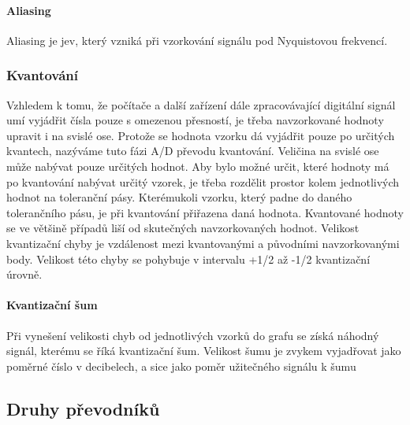 \paragraph{Aliasing}
Aliasing je jev, který vzniká při vzorkování signálu pod Nyquistovou frekvencí.

\subsubsection{Kvantování}
Vzhledem k tomu, že počítače a další zařízení dále zpracovávající digitální signál umí vyjádřit čísla pouze s omezenou přesností, je třeba navzorkované hodnoty upravit i na svislé ose. Protože se hodnota vzorku dá vyjádřit pouze po určitých kvantech, nazýváme tuto fázi A/D převodu kvantování. Veličina na svislé ose může nabývat pouze určitých hodnot. Aby bylo možné určit, které hodnoty má po kvantování nabývat určitý vzorek, je třeba rozdělit prostor kolem jednotlivých hodnot na toleranční pásy. Kterémukoli vzorku, který padne do daného tolerančního pásu, je při kvantování přiřazena daná hodnota. Kvantované hodnoty se ve většině případů liší od skutečných navzorkovaných hodnot. Velikost kvantizační chyby je vzdálenost mezi kvantovanými a původními navzorkovanými body. Velikost této chyby se pohybuje v intervalu +1/2 až -1/2 kvantizační úrovně. 

\paragraph{Kvantizační šum}
Při vynešení velikosti chyb od jednotlivých vzorků do grafu se získá náhodný signál, kterému se říká kvantizační šum. Velikost šumu je zvykem vyjadřovat jako poměrné číslo v decibelech, a sice jako poměr užitečného signálu k šumu
\subsection{Druhy převodníků}

